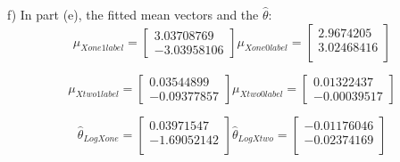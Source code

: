 \documentclass[11pt]{article}
\newenvironment{problem}[2][Problem]{\begin{trivlist}
\item[\hskip \labelsep {\bfseries #1}\hskip \labelsep {\bfseries #2.}]}{\end{trivlist}}
\begin{document}
\begin{problem}{2.4}
(f) In part (e), the fitted mean vectors and the $\hat{\theta}$:
\[\mu_{Xone1label}=
	\begin{bmatrix}
		3.03708769\\
		-3.03958106 
	 \end{bmatrix}
   \mu_{Xone0label}=
	\begin{bmatrix}
		2.9674205\\
		3.02468416\\
	 \end{bmatrix}
\]

\[\mu_{Xtwo1label}=
	\begin{bmatrix}
		0.03544899\\
		-0.09377857
	 \end{bmatrix}
   \mu_{Xtwo0label}=
	\begin{bmatrix}
		0.01322437\\
		-0.00039517
	 \end{bmatrix}
\]

\[\hat{\theta}_{LogXone}=
	\begin{bmatrix}
		0.03971547\\
		-1.69052142\\
	 \end{bmatrix}
   \hat{\theta}_{LogXtwo}=
	\begin{bmatrix}
		-0.01176046\\
		-0.02374169\\
	 \end{bmatrix}
\]

\end{problem}
\end{document}
